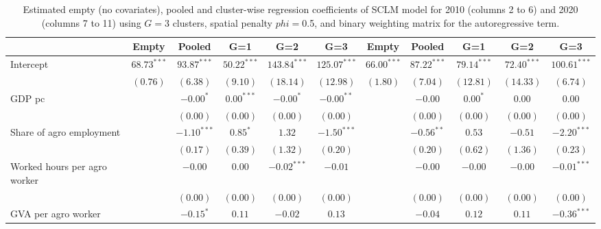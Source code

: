 
\begin{table}
\caption{Estimated empty (no covariates), pooled and cluster-wise regression coefficients of SCLM model for 2010 (columns 2 to 6) and 2020 (columns 7 to 11) using $G=$3 clusters, spatial penalty $phi=$0.5, and binary weighting matrix for the autoregressive term.}
\begin{center}
\begin{tabular}{l c c c c c c c c c c}
\hline
 & Empty & Pooled & G=1 & G=2 & G=3 & Empty & Pooled & G=1 & G=2 & G=3 \\
\hline
Intercept                         & $68.73^{***}$ & $93.87^{***}$ & $50.22^{***}$ & $143.84^{***}$ & $125.07^{***}$ & $66.00^{***}$ & $87.22^{***}$ & $79.14^{***}$ & $72.40^{***}$ & $100.61^{***}$ \\
                                  & $(0.76)$      & $(6.38)$      & $(9.10)$      & $(18.14)$      & $(12.98)$      & $(1.80)$      & $(7.04)$      & $(12.81)$     & $(14.33)$     & $(6.74)$       \\
GDP pc                            &               & $-0.00^{*}$   & $0.00^{***}$  & $-0.00^{*}$    & $-0.00^{**}$   &               & $-0.00$       & $0.00^{*}$    & $0.00$        & $0.00$         \\
                                  &               & $(0.00)$      & $(0.00)$      & $(0.00)$       & $(0.00)$       &               & $(0.00)$      & $(0.00)$      & $(0.00)$      & $(0.00)$       \\
Share of agro employment          &               & $-1.10^{***}$ & $0.85^{*}$    & $1.32$         & $-1.50^{***}$  &               & $-0.56^{**}$  & $0.53$        & $-0.51$       & $-2.20^{***}$  \\
                                  &               & $(0.17)$      & $(0.39)$      & $(1.32)$       & $(0.20)$       &               & $(0.20)$      & $(0.62)$      & $(1.36)$      & $(0.23)$       \\
Worked hours per agro worker      &               & $-0.00$       & $0.00$        & $-0.02^{***}$  & $-0.01$        &               & $-0.00$       & $-0.00$       & $-0.00$       & $-0.01^{***}$  \\
                                  &               & $(0.00)$      & $(0.00)$      & $(0.00)$       & $(0.00)$       &               & $(0.00)$      & $(0.00)$      & $(0.00)$      & $(0.00)$       \\
GVA per agro worker               &               & $-0.15^{*}$   & $0.11$        & $-0.02$        & $0.13$         &               & $-0.04$       & $0.12$        & $0.11$        & $-0.36^{***}$  \\

\end{tabular}
\end{center}
\end{table}
